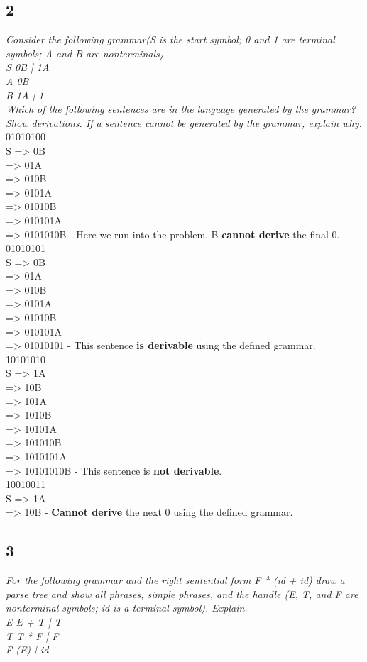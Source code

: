 \documentclass[a4paper,man,natbib]{apa6}
\begin{document}
\subsection{2}
\emph{Consider the following grammar(S is the start symbol; 0 and 1 are terminal symbols; A and B are nonterminals) \\ S  0B | 1A \\ A  0B \\ B  1A | 1 } \\
\noindent\emph{Which of the following sentences are in the language generated by the grammar?  Show derivations.  If a sentence cannot be generated by the grammar, explain why.} \\[2ex]
01010100 \\
S => 0B \\
=> 01A \\
=> 010B \\
=> 0101A \\ 
=> 01010B \\
=> 010101A \\
=> 0101010B - Here we run into the problem. B \textbf{cannot derive} the final 0. \\[2ex]
01010101 \\
S => 0B \\
=> 01A \\
=> 010B \\
=> 0101A \\
=> 01010B \\
=> 010101A \\
=> 01010101 - This sentence \textbf{is derivable} using the defined grammar. \\[2ex]
10101010 \\
S => 1A \\
=> 10B \\
=> 101A \\
=> 1010B \\
=> 10101A \\
=> 101010B \\
=> 1010101A \\
=> 10101010B - This sentence is \textbf{not derivable}. \\[2ex]
10010011 \\
S => 1A \\
=> 10B - \textbf{Cannot derive} the next 0 using the defined grammar. \\
\clearpage
\subsection{3}
\emph{For the following grammar and the right sentential form F * (id + id) draw a parse tree and show all phrases, simple phrases, and the handle (E, T, and F are nonterminal symbols; id is a terminal symbol). Explain. \\ E  E + T | T \\ T  T * F | F \\ F  (E) | id } \\[2ex]
\end{document}
